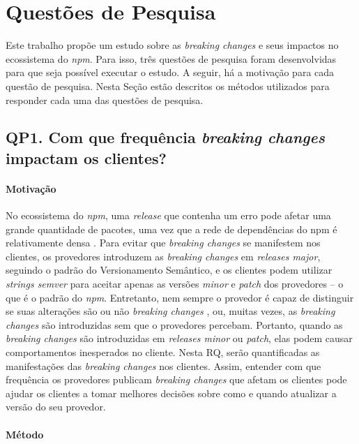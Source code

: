 \chapter{Questões de Pesquisa}
\label{cap:qp}

Este trabalho propõe um estudo sobre as \textit{breaking changes} e seus impactos no ecossistema do \textit{npm}. Para isso, três questões de pesquisa foram desenvolvidas para que seja possível executar o estudo. A seguir, há a motivação para cada questão de pesquisa. Nesta Seção estão descritos os métodos utilizados para responder cada uma das questões de pesquisa.
\section{QP1. Com que frequência \textit{breaking changes} impactam os clientes?}
\label{sec:qp1}

\subsubsection{Motivação}
\label{sec:qp1:motivation}
No ecossistema do \textit{npm}, uma \textit{release} que contenha um erro pode afetar uma grande quantidade de pacotes, uma vez que a rede de dependências do npm é relativamente densa \cite{teorical_reference:npm_2}. Para evitar que \textit{breaking changes} se manifestem nos clientes, os provedores introduzem as \textit{breaking changes} em \textit{releases major}, seguindo o padrão do Versionamento Semântico, e os clientes podem utilizar \textit{strings semver} para aceitar apenas as versões \textit{minor} e \textit{patch} dos provedores -- o que é o padrão do \textit{npm}. Entretanto, nem sempre o provedor é capaz de distinguir se suas alterações são ou não \textit{breaking changes} \cite{noregrets2018}, ou, muitas vezes, as \textit{breaking changes} são introduzidas sem que o provedores percebam. Portanto, quando as \textit{breaking changes} são introduzidas em \textit{releases minor} ou \textit{patch}, elas podem causar comportamentos inesperados no cliente. Nesta RQ, serão quantificadas as manifestações das \textit{breaking changes} nos clientes. Assim, entender com que frequência os provedores publicam \textit{breaking changes} que afetam os clientes pode ajudar os clientes a tomar melhores decisões sobre como e quando atualizar a versão do seu provedor.

\subsubsection{Método}
\label{sec:qp1:approach}


